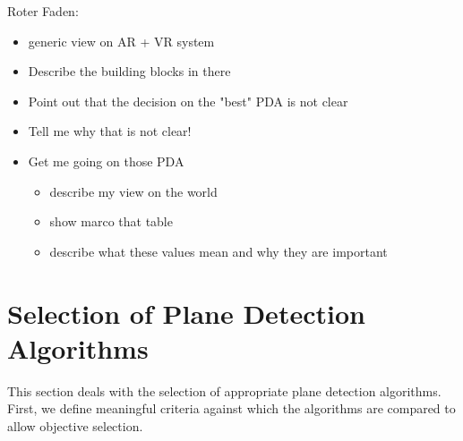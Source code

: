 \documentclass[main.tex]{subfiles}
\begin{document}






Roter Faden:
\begin{itemize}
    \item generic view on AR + VR system
    \item Describe the building blocks in there
    \item Point out that the decision on the "best" PDA is not clear
    \item Tell me why that is not clear!
    \item Get me going on those PDA
          \begin{itemize}
              \item describe my view on the world
              \item show marco that table
              \item describe what these values mean and why they are important
          \end{itemize}
\end{itemize}

\section{Selection of Plane Detection Algorithms}\label{sec:pdaselection}
This section deals with the selection of appropriate plane detection algorithms.
First, we define meaningful criteria against which the algorithms are compared to allow objective selection.
\end{document}
